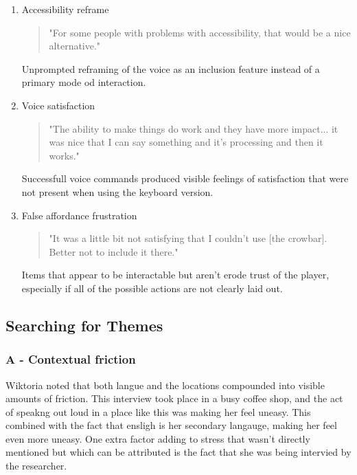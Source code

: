 \begin{enumerate}
        \begin{quote}
            "It's something new and it's cool to see something new... I think it would be even cooler if you could do more things." 
        \end{quote}
        Appreciation for the concept despite it's current limitations or stressors caused by it's form.


        \item Accessibility reframe 
    
        \begin{quote}
            "For some people with problems with accessibility, that would be a nice alternative." 
        \end{quote}
        Unprompted reframing of the voice as an inclusion feature instead of a primary mode od interaction.


        \item Voice satisfaction
    
        \begin{quote}
            "The ability to make things do work and they have more impact... it was nice that I can say something and it's processing and then it works."
        \end{quote}
        Successfull voice commands produced visible feelings of satisfaction that were not present when using the keyboard version.


        \item False affordance frustration
    
        \begin{quote}
            "It was a little bit not satisfying that I couldn't use [the crowbar]. Better not to include it there." 
        \end{quote}
        Items that appear to be interactable but aren't erode trust of the player, especially if all of the possible actions are not clearly laid out.
         

\end{enumerate}


\subsection{Searching for Themes}

\subsubsection{A - Contextual friction}
Wiktoria noted that both langue and the locations compounded into visible amounts of friction. 
This interview took place in a busy coffee shop, and the act of speakng out loud in a place like this was making her feel uneasy. This combined with the fact that ensligh is her secondary langauge, making her feel even more uneasy. One extra factor adding to stress that wasn't directly mentioned but which can be attributed is the fact that she was being intervied by the researcher.


